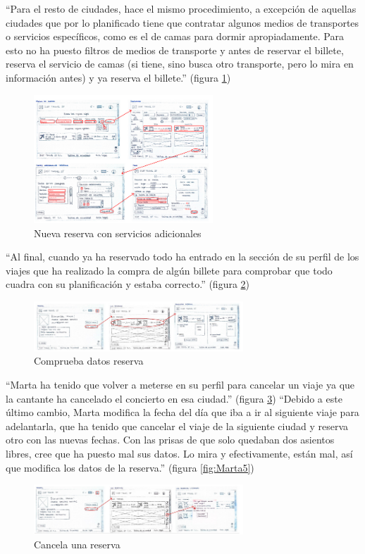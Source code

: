“Para el resto de ciudades, hace el mismo procedimiento, a excepción de aquellas ciudades que por lo planificado tiene que contratar algunos medios de transportes 
o servicios específicos, como es el de camas para dormir apropiadamente. Para esto no ha puesto filtros de medios de transporte y antes de reservar el billete, 
reserva el servicio de camas (si tiene, sino busca otro transporte, pero lo mira en información antes) y ya reserva el billete.” (figura \ref{fig:Marta2})
\begin{figure}[h]
    \centering
    \includegraphics[width=0.6\textwidth]{Imagenes/Keypath/Marta2.png}
    \caption{Nueva reserva con servicios adicionales}
    \label{fig:Marta2}
\end{figure}

“Al final, cuando ya ha reservado todo ha entrado en la sección de su perfil de los viajes que ha realizado la compra de algún billete para comprobar que todo 
cuadra con su planificación y estaba correcto.” (figura \ref{fig:Marta3})
\begin{figure}[h]
    \centering
    \includegraphics[width=0.7\textwidth]{Imagenes/Keypath/Marta3.png}
    \caption{Comprueba datos reserva}
    \label{fig:Marta3}
\end{figure}

“Marta ha tenido que volver a meterse en su perfil para cancelar un viaje ya que la cantante ha cancelado el concierto en esa ciudad.” (figura \ref{fig:Marta4}) “Debido 
a este último cambio, Marta modifica la fecha del día que iba a ir al siguiente viaje para adelantarla, que ha tenido que cancelar el viaje de la siguiente ciudad 
y reserva otro con las nuevas fechas. Con las prisas de que solo quedaban dos asientos libres, cree que ha puesto mal sus datos. Lo mira y efectivamente, 
están mal, así que modifica los datos de la reserva.” (figura \ref{fig:Marta5})
\begin{figure}[h]
    \centering
    \includegraphics[width=0.7\textwidth]{Imagenes/Keypath/Marta4.png}
    \caption{Cancela una reserva}
    \label{fig:Marta4}
\end{figure}

